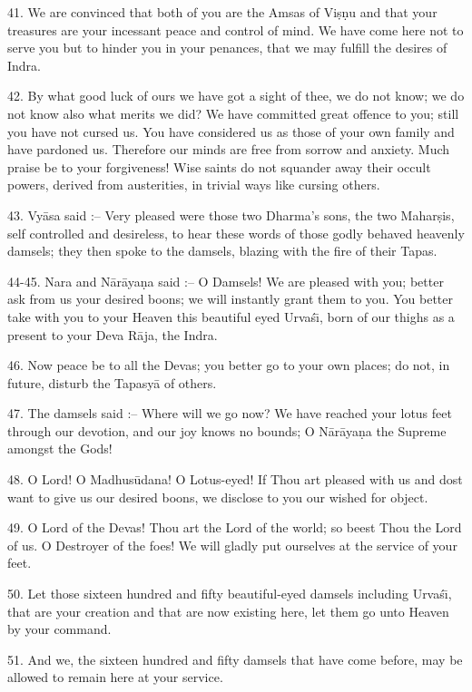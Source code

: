 41. We are convinced that both of you are the Amsas of Vi\d{s}\d{n}u and that your treasures are your incessant peace and control of mind. We have come here not to serve you but to hinder you in your penances, that we may fulfill the desires of Indra.

42. By what good luck of ours we have got a sight of thee, we do not know; we do not know also what merits we did? We have committed great offence to you; still you have not cursed us. You have considered us as those of your own family and have pardoned us. Therefore our minds are free from sorrow and anxiety. Much praise be to your forgiveness! Wise saints do not squander away their occult powers, derived from austerities, in trivial ways like cursing others.

43. Vy\=asa said :-- Very pleased were those two Dharma's sons, the two Mahar\d{s}is, self controlled and desireless, to hear these words of those godly behaved heavenly damsels; they then spoke to the damsels, blazing with the fire of their Tapas.

44-45. Nara and N\=ar\=aya\d{n}a said :-- O Damsels! We are pleased with you; better ask from us your desired boons; we will instantly grant them to you. You better take with you to your Heaven this beautiful eyed Urva\'s\={\i}, born of our thighs as a present to your Deva R\=aja, the Indra.

46. Now peace be to all the Devas; you better go to your own places; do not, in future, disturb the Tapasy\=a of others.

47. The damsels said :-- Where will we go now? We have reached your lotus feet through our devotion, and our joy knows no bounds; O N\=ar\=aya\d{n}a the Supreme amongst the Gods!

48. O Lord! O Madhus\=udana! O Lotus-eyed! If Thou art pleased with us and dost want to give us our desired boons, we disclose to you our wished for object.

49. O Lord of the Devas! Thou art the Lord of the world; so beest Thou the Lord of us. O Destroyer of the foes! We will gladly put ourselves at the service of your feet.

50. Let those sixteen hundred and fifty beautiful-eyed damsels including Urva\'s\={\i}, that are your creation and that are now existing here, let them go unto Heaven by your command.

51. And we, the sixteen hundred and fifty damsels that have come before, may be allowed to remain here at your service.

